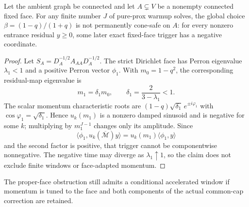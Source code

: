 \documentclass[11pt]{article}
\begin{document}
\begin{proposition}
\label{prop:proper-face-global-momentum-stop}
Let the ambient graph be connected and let $A\subsetneq V$ be a nonempty
connected fixed face.  For any finite number $J$ of pure-prox warmup solves,
the global choice $\beta=(1-q)/(1+q)$ is not permanently cone-safe on $A$:
for every nonzero entrance residual $y\geq0$, some later exact fixed-face
trigger has a negative coordinate.
\end{proposition}

\begin{proof}
Let $S_A=D_A^{-1/2}A_{AA}D_A^{-1/2}$.  The strict Dirichlet face has Perron
eigenvalue $\lambda_1<1$ and a positive Perron vector $\phi_1$.  With
$m_0=1-q^2$, the corresponding residual-map eigenvalue is
\[
 m_1=\delta_1m_0,
 \qquad \delta_1=\frac{2}{3-\lambda_1}<1.
\]
The scalar momentum characteristic roots are
$(1-q)\sqrt{\delta_1}\,e^{\pm i\varphi_1}$ with
$\cos\varphi_1=\sqrt{\delta_1}$.  Hence $u_k(m_1)$ is a nonzero damped
sinusoid and is negative for some $k$; multiplying by $m_1^{J-1}$ changes
only its amplitude.  Since
\[
 \langle\phi_1,u_k(\overline{\mathcal M})y\rangle
 =u_k(m_1)\langle\phi_1,y\rangle
\]
and the second factor is positive, that trigger cannot be componentwise
nonnegative.  The negative time may diverge as $\lambda_1\uparrow1$, so the
claim does not exclude finite windows or face-adapted momentum.
\end{proof}

The proper-face obstruction still admits a conditional accelerated window if
momentum is tuned to the face and both components of the actual common-cap
correction are retained.
\end{document}
